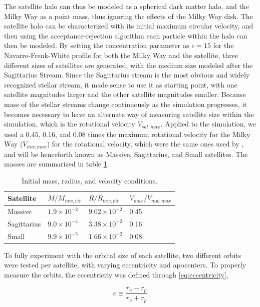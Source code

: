 \documentclass[twocolumn]{article}
\begin{document}
The satellite halo can thus be modeled as a spherical dark matter halo, and the Milky Way as a point mass, thus ignoring the effects of the Milky Way disk. The satellite halo can be characterized with its initial maximum circular velocity, and then using the acceptance-rejection algorithm each particle within the halo can then be modeled. By setting the concentration parameter as $c = 15$ for the Navarro-Frenk-White profile for both the Milky Way and the satellite, three different sizes of satellites are generated, with the medium size modeled after the Sagittarius Stream. Since the Sagittarius stream is the most obvious and widely recognized stellar stream, it made sense to use it as starting point, with one satellite magnitudes larger and the other satellite magnitudes smaller. Because mass of the stellar streams change continuously as the simulation progresses, it becomes necessary to have an alternate way of measuring satellite size within the simulation, which is the rotational velocity $V_{sat, max}$. Applied to the simulation, we used a 0.45, 0.16, and 0.08 times the maximum rotational velocity for the Milky Way ($V_{mw, max}$) for the rotational velocity, which were the same ones used by \cite{dynamicsOfTidalTails}, and will be henceforth known as Massive, Sagittarius, and Small satellites. The masses are summarized in table \ref{tab:massTable}.

\begin{table}[t]
	\centering
	\begin{tabular}{| l | l | l | l | }
		\hline Satellite & $M/M_{mw, vir}$ & $R/R_{mw, vir}$ & $V_{max}/V_{mw, max}$ \\ \hline
		Massive & $1.9 \times 10^{-2}$ & $9.02 \times 10^{-2}$ & 0.45 \\ \hline
		Sagittarius & $9.0 \times 10^{-4}$ & $3.38 \times 10^{-2}$ & 0.16 \\ \hline
		Small & $9.9 \times 10^{-5}$ & $1.66 \times 10^{-2}$ & 0.08 \\ \hline
	\end{tabular}
	\caption{Initial mass, radius, and velocity conditions. }
	\label{tab:massTable}
\end{table}

To fully experiment with the orbital size of each satellite, two different orbits were tested per satellite, with varying eccentricity and apocenters. To properly measure the orbits, the eccentricity was defined through \ref{eq:eccentricity},

\begin{equation}
e \equiv \frac{r_a-r_p}{r_a+r_p}
\label{eq:eccentricity}
\end{equation}
\end{document}
